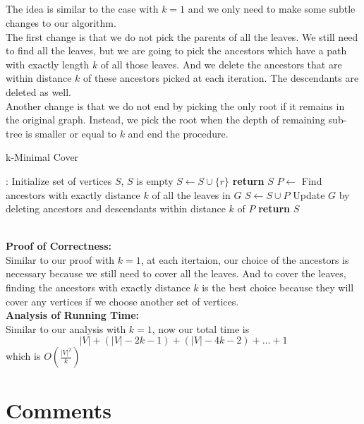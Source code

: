 \documentclass[12pt,letterpaper]{article}
\begin{document}
\subsection{}
The idea is similar to the case with $k=1$ and we only need to make some subtle changes to our algorithm.\\
The first change is that we do not pick the parents of all the leaves.
We still need to find all the leaves, 
but we are going to pick the ancestors which have a path with exactly length $k$ of all those leaves.
And we delete the ancestors that are within distance $k$ of these ancestors picked at each iteration.
The descendants are deleted as well.\\
Another change is that we do not end by picking the only root if it remains in the original graph.
Instead, we pick the root when the depth of remaining sub-tree is smaller or equal to $k$ and end the procedure.
\begin{algorithm}
  \caption{k-Minimal Cover}\label{alg:kcover}
  \begin{algorithmic}[1]
  :
  \State Initialize set of vertices $S$, $S$ is empty
  \State $S\gets S\cup\{r\}$
  \State \textbf{return} $S$
  \EndIf
  \State $P\gets$ Find ancestors with exactly distance $k$ of all the leaves in $G$
  \State $S\gets S\cup P$
  \State Update $G$ by deleting ancestors and descendants within distance $k$ of $P$ 
  \EndWhile
  \State \textbf{return} $S$
  \EndProcedure
  \end{algorithmic}
\end{algorithm}\\
\textbf{Proof of Correctness:}\\
Similar to our proof with $k=1$, at each itertaion,
our choice of the ancestors is necessary because we still need to cover all the leaves.
And to cover the leaves, finding the ancestors with exactly distance $k$ is the best choice 
because they will cover any vertices if we choose another set of vertices.\\
\textbf{Analysis of Running Time:}\\
Similar to our analysis with $k=1$, now our total time is 
$$|V|+(|V|-2k-1)+(|V|-4k-2)+\dots+1$$
which is $O(\frac{|V|^2}{k})$

\section{Comments}
\end{document}
